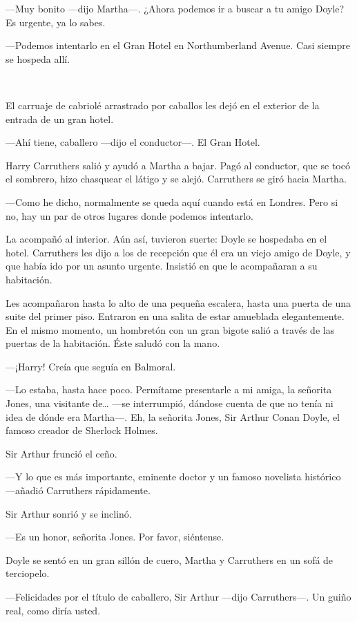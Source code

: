 ---Muy bonito ---dijo Martha---. ¿Ahora podemos ir a buscar a tu amigo
Doyle? Es urgente, ya lo sabes.

---Podemos intentarlo en el Gran Hotel en Northumberland Avenue. Casi
siempre se hospeda allí.

~

El carruaje de cabriolé arrastrado por caballos les dejó en el exterior
de la entrada de un gran hotel.

---Ahí tiene, caballero ---dijo el conductor---. El Gran Hotel.

Harry Carruthers salió y ayudó a Martha a bajar. Pagó al conductor, que
se tocó el sombrero, hizo chasquear el látigo y se alejó. Carruthers se
giró hacia Martha.

---Como he dicho, normalmente se queda aquí cuando está en Londres. Pero
si no, hay un par de otros lugares donde podemos intentarlo.

La acompañó al interior. Aún así, tuvieron suerte: Doyle se hospedaba en
el hotel. Carruthers les dijo a los de recepción que él era un viejo
amigo de Doyle, y que había ido por un asunto urgente. Insistió en que
le acompañaran a su habitación.

Les acompañaron hasta lo alto de una pequeña escalera, hasta una puerta
de una suite del primer piso. Entraron en una salita de estar amueblada
elegantemente. En el mismo momento, un hombretón con un gran bigote
salió a través de las puertas de la habitación. Éste saludó con la mano.

---¡Harry! Creía que seguía en Balmoral.

---Lo estaba, hasta hace poco. Permítame presentarle a mi amiga, la
señorita Jones, una visitante de\ldots{} ---se interrumpió, dándose
cuenta de que no tenía ni idea de dónde era Martha---. Eh, la señorita
Jones, Sir Arthur Conan Doyle, el famoso creador de Sherlock Holmes.

Sir Arthur frunció el ceño.

---Y lo que es más importante, eminente doctor y un famoso novelista
histórico ---añadió Carruthers rápidamente.

Sir Arthur sonrió y se inclinó.

---Es un honor, señorita Jones. Por favor, siéntense.

Doyle se sentó en un gran sillón de cuero, Martha y Carruthers en un
sofá de terciopelo.

---Felicidades por el título de caballero, Sir Arthur ---dijo
Carruthers---. Un guiño real, como diría usted.

